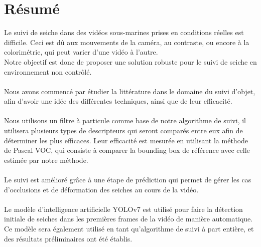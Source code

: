 \pagestyle{plain}
\chapter*{Résumé}
Le suivi de seiche dans des vidéos sous-marines prises en conditions réelles est difficile. Ceci est dû aux mouvements de la caméra, au contraste, ou encore à la colorimétrie, qui peut varier d'une vidéo à l'autre.\\
Notre objectif est donc de proposer une solution robuste pour le suivi de seiche en environnement non contrôlé.\\
\\
Nous avons commencé par étudier la littérature dans le domaine du suivi d'objet, afin d'avoir une idée des différentes techniques, ainsi que de leur efficacité.\\
\\
Nous utilisons un filtre à particule comme base de notre algorithme de suivi, il utilisera plusieurs types de descripteurs qui seront comparés entre eux afin de déterminer les plus efficaces. Leur efficacité est mesurée en utilisant la méthode de Pascal VOC, qui consiste à comparer la bounding box de référence avec celle estimée par notre méthode.\\
\\
Le suivi est amélioré grâce à une étape de prédiction qui permet de gérer les cas d'occlusions et de déformation des seiches au cours de la vidéo.\\
\\
Le modèle d'intelligence artificielle YOLOv7 est utilisé pour faire la détection initiale de seiches dans les premières frames de la vidéo de manière automatique.\\
Ce modèle sera également utilisé en tant qu'algorithme de suivi à part entière, et des résultats préliminaires ont été établis.\\


\clearpage
